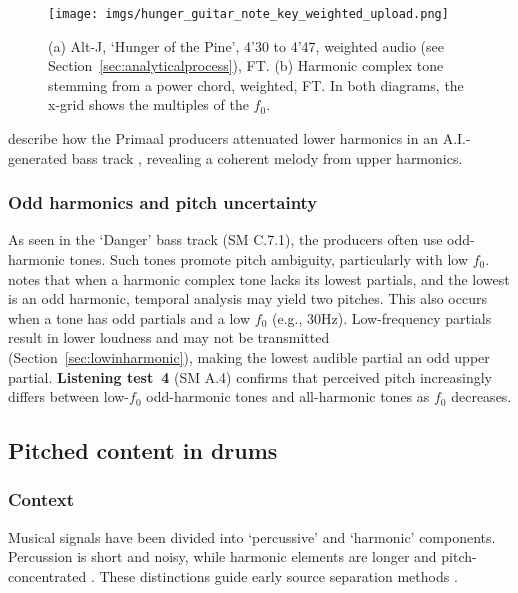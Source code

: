 \documentclass{article}
\begin{document}
\begin{figure}[htbp]
  \centering
  \texttt{[image: imgs/hunger\_guitar\_note\_key\_weighted\_upload.png]}
\caption{(a) Alt-J, `Hunger of the Pine', 4'30 to 4'47, weighted audio (see Section~\ref{sec:analyticalprocess}), FT. (b) Harmonic complex tone stemming from a power chord, weighted, FT. In both diagrams, the x-grid shows the multiples of the $f_0$.}
\label{fig:Hunger}
\end{figure}



\citet{deruty2022melatonin} describe how the Primaal producers attenuated lower harmonics in an A.I.-generated bass track \citep{grachten2020bassnet}, revealing a coherent melody from upper harmonics.



\subsubsection{Odd harmonics and pitch uncertainty}\label{sec:oddharmonicspitchuncertainty}



As seen in the `Danger' bass track (SM C.7.1), the producers often use odd-harmonic tones. Such tones promote pitch ambiguity, particularly with low $f_0$. \citet[pp.~1705--1706]{yost2009pitch} notes that when a harmonic complex tone lacks its lowest partials, and the lowest is an odd harmonic, temporal analysis may yield two pitches. This also occurs when a tone has odd partials and a low $f_0$ (e.g., 30Hz). Low-frequency partials result in lower loudness and may not be transmitted (Section~\ref{sec:lowinharmonic}), making the lowest audible partial an odd upper partial. \textbf{Listening test~4} (SM A.4) confirms that perceived pitch increasingly differs between low-$f_0$ odd-harmonic tones and all-harmonic tones as $f_0$ decreases.



\subsection{Pitched content in drums}\label{sec:pitchcontentindrums}

\subsubsection{Context}

Musical signals have been divided into `percussive' and `harmonic' components. Percussion is short and noisy, while harmonic elements are longer and pitch-concentrated \citep{rump2010autoregressive}. These distinctions guide early source separation methods \citep{fitzgerald2010harmonic,yoo2010nonnegative}.
\end{document}
